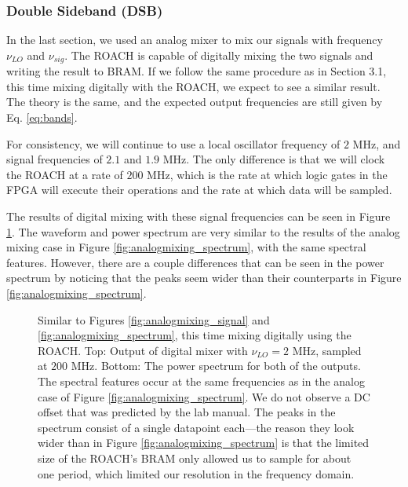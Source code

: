 \documentclass[12pt]{article}
\begin{document}
\subsubsection{Double Sideband (DSB)}
In the last section, we used an analog mixer to mix our signals with frequency $\nu_{LO}$ and $\nu_{sig}$. The ROACH is capable of digitally mixing the two signals and writing the result to BRAM. If we follow the same procedure as in Section 3.1, this time mixing digitally with the ROACH, we expect to see a similar result. The theory is the same, and the expected output frequencies are still given by Eq. \ref{eq:bands}.

For consistency, we will continue to use a local oscillator frequency of $2$ MHz, and signal frequencies of $2.1$ and $1.9$ MHz. The only difference is that we will clock the ROACH at a rate of $200$ MHz, which is the rate at which logic gates in the FPGA will execute their operations and the rate at which data will be sampled.

The results of digital mixing with these signal frequencies can be seen in Figure \ref{fig:digitalmixing}. The waveform and power spectrum are very similar to the results of the analog mixing case in Figure \ref{fig:analogmixing_spectrum}, with the same spectral features. However, there are a couple differences that can be seen in the power spectrum by noticing that the peaks seem wider than their counterparts in Figure \ref{fig:analogmixing_spectrum}.

\begin{figure}[H]
\caption[SODUMB]{Similar to Figures \ref{fig:analogmixing_signal} and \ref{fig:analogmixing_spectrum}, this time mixing digitally using the ROACH. Top: Output of digital mixer with $\nu_{LO}=2$ MHz, sampled at $200$ MHz.  Bottom: The power spectrum for both of the outputs. The spectral features occur at the same frequencies as in the analog case of Figure \ref{fig:analogmixing_spectrum}.  We do not observe a DC offset that was predicted by the lab manual. The peaks in the spectrum consist of a single datapoint each---the reason they look wider than in Figure \ref{fig:analogmixing_spectrum} is that the limited size of the ROACH's BRAM only allowed us to sample for about one period, which limited our resolution in the frequency domain.}
\label{fig:digitalmixing}
\end{figure}
\end{document}
